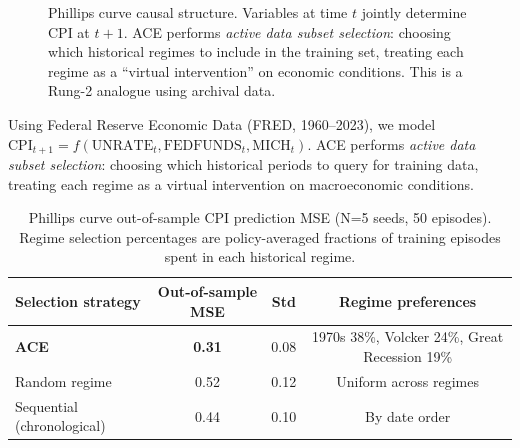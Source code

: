 \begin{figure}[h]
\centering
{}
\caption{Phillips curve causal structure. Variables at time $t$ jointly determine CPI at $t+1$. ACE performs \emph{active data subset selection}: choosing which historical regimes to include in the training set, treating each regime as a ``virtual intervention'' on economic conditions. This is a Rung-2 analogue using archival data.}
\label{fig:phillips-scm}
\end{figure}

Using Federal Reserve Economic Data \citep{fred2024} (FRED, 1960--2023), we model $\text{CPI}_{t+1} = f(\text{UNRATE}_t, \text{FEDFUNDS}_t, \text{MICH}_t)$. ACE performs \emph{active data subset selection}: choosing which historical periods to query for training data, treating each regime as a virtual intervention on macroeconomic conditions.

\begin{table}[h]
\centering
\caption{Phillips curve out-of-sample CPI prediction MSE (N=5 seeds, 50 episodes). Regime selection percentages are policy-averaged fractions of training episodes spent in each historical regime.}
\label{tab:phillips-results}
\small
\begin{tabular}{@{}lccc@{}}
\toprule
Selection strategy & Out-of-sample MSE & Std & Regime preferences \\
\midrule
\textbf{ACE}               & \textbf{0.31} & 0.08 & 1970s 38\%, Volcker 24\%, Great Recession 19\% \\
Random regime              & 0.52          & 0.12 & Uniform across regimes \\
Sequential (chronological) & 0.44          & 0.10 & By date order \\
\bottomrule
\end{tabular}
\end{table}

